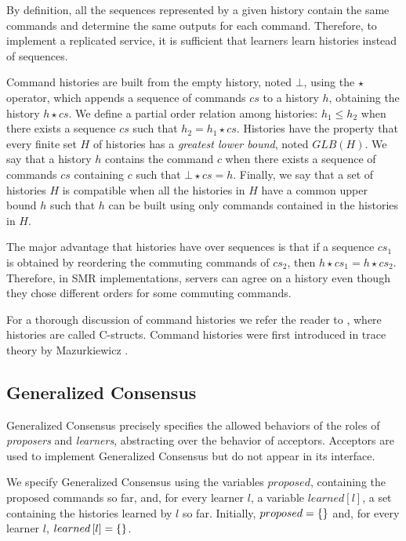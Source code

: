 \documentclass{llncs}
\begin{document}
By definition, all the sequences represented by a given history contain the same commands
and determine the same outputs for each command. Therefore, to implement a
replicated service, it is sufficient that learners learn histories instead of
sequences. 

Command histories are built from the empty history, noted $\bot$, using the $\star$
operator, which appends a sequence of commands $cs$ to a history $h$, obtaining
the history $h \star cs$. We define a partial order relation among
histories: $h_1 \leq h_2$ when there exists a sequence $cs$ such that $h_2 = h_1
\star cs$. Histories have the property that every finite set $H$ of histories
has a \emph{greatest lower bound}, noted $GLB\left(H\right)$. 
We say that a history $h$ contains the command $c$ when there exists a sequence of commands 
$cs$ containing $c$ such that $\bot \star cs = h$.
Finally, we say
that a set of histories $H$ is compatible when all the histories in $H$ have a
common upper bound $h$ such that $h$ can be built using only commands contained in
the histories in $H$.

The major advantage that histories have over sequences is that if a sequence
$cs_1$ is obtained by reordering the commuting commands of $cs_2$, then $h \star
cs_1 = h \star cs_2$. Therefore, in SMR implementations, servers can agree on
a history even though they chose different orders for some commuting commands.

For a thorough discussion of command histories we refer the reader
to \cite{Lamport05GeneralizeConsensus}, where histories are called C-structs. 
Command histories were first introduced in trace theory by Mazurkiewicz 
\cite{Mazurkiewicz84Semantics}.


\subsection{Generalized Consensus}

Generalized Consensus precisely specifies the allowed behaviors of the roles of \emph{proposers}
and \emph{learners}, abstracting over the behavior of acceptors. Acceptors are used to implement Generalized Consensus but do not appear in its interface.

We specify Generalized Consensus using the variables $proposed$, containing the proposed commands so far,
and, for every learner $l$,  a variable $learned\left[ l \right]$, a set containing the histories learned by $l$ so far. Initially, $proposed = \left\{\right\}$ and, for every learner $l$,
$learned\left[ l \right] = \left\{\right\}$. 
\end{document}
